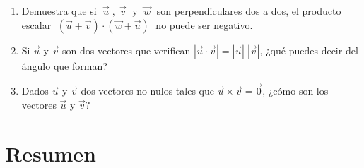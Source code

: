 \begin{enumerate}[Q1. ]

\item Demuestra que si $\; \vec u \;,\; \vec v\; $ y $\;\vec w\;$ son perpendiculares dos a dos, el producto escalar $\;(\vec u+\vec v)\cdot(\vec w+\vec u)\;$ no puede ser negativo.



\item Si $\vec u$ y $\vec v$ son dos vectores que verifican $|\vec u \cdot \vec v|=|\vec u|\;|\vec v|$, ¿qué puedes decir del ángulo que forman?



\item Dados $\vec u$ y $\vec v$ dos vectores no nulos tales que $\vec u \times \vec v=\vec 0$, ¿cómo son los vectores $\vec u$ y $\vec v$?


\end{enumerate}

\newpage
\section{Resumen}

